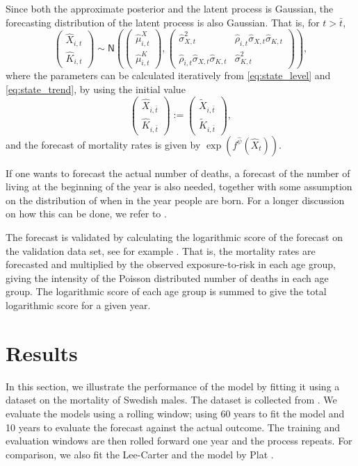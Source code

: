 \documentclass[preprint,12pt]{elsarticle}
\newcommand{\m}[1]{\begin{pmatrix}
#1
\end{pmatrix}}
\newcommand{\pa}[1]{\left(#1\right)}
\begin{document}
Since both the approximate posterior and the latent process is Gaussian, the forecasting distribution of the latent process is also Gaussian. That is, for $t>\bar t$,
\begin{equation}
\m{
\hat X_{i,t}\\ \hat K_{i,t}} 
\sim \mathsf N\pa{
\m{\hat\mu^X_{i,t}\\
\hat\mu^K_{i,t}}
,
\m{
\hat \sigma^2_{X,t} & \hat\rho_{i,t}\hat \sigma_{X,t}\hat \sigma_{K,t}\\
 \hat\rho_{i,t}\hat \sigma_{X,t}\hat \sigma_{K,t} & \hat \sigma^2_{K,t}
}
},
\end{equation}
where the parameters can be calculated iteratively from \eqref{eq:state_level} and \eqref{eq:state_trend}, by using the initial value
\begin{equation}
	\m{
\hat X_{i,\bar t}\\ \hat K_{i,\bar t}}:=  	\m{
\tilde X_{i,\bar t}\\ \tilde K_{i,\bar t}},
\end{equation}
and  the forecast of mortality rates is given by $\exp(f^{\hat \psi}(\hat X_t))$.

If one wants to forecast the actual number of deaths, a forecast of the number of living at the beginning of the year is also needed, together with some assumption on the distribution of when in the year people are born. For a longer discussion on how this can be done, we refer to \cite{andersson2020mortality}.

The forecast is validated by calculating the logarithmic score of the forecast on the validation data set, see for example \cite{gneiting2007strictly}. That is, the mortality rates are forecasted and multiplied by the observed exposure-to-risk in each age group, giving the intensity of the Poisson distributed number of deaths in each age group. The logarithmic score of each age group is summed to give the total logarithmic score for a given year.

\section{Results}\label{sec:results}

In this section, we illustrate the performance of the model by fitting it using a dataset on the mortality of Swedish males. The dataset is collected from \cite{hmd2018data}. We evaluate the models using a rolling window; using 60 years to fit the model and 10 years to evaluate the forecast against the actual outcome. The training and evaluation windows are then rolled forward one year and the process repeats. For comparison, we also fit the Lee-Carter and the model by Plat \citep{plat2009stochastic}.
\end{document}
